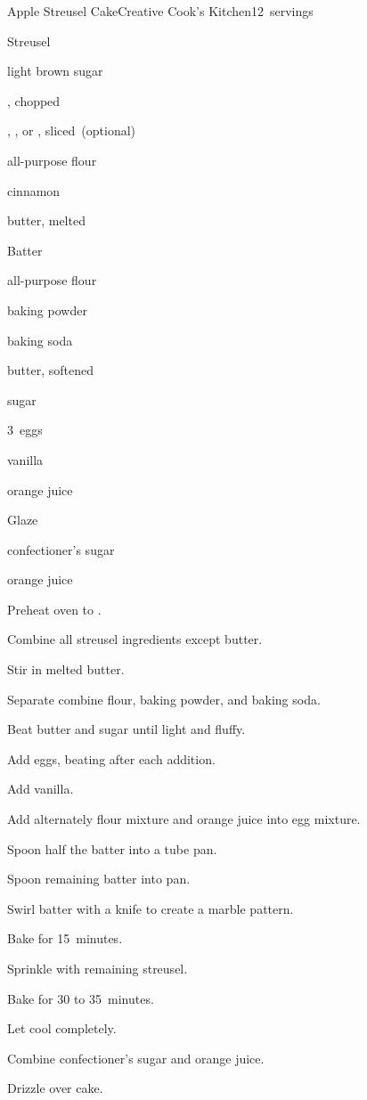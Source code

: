 \begin{recipe}{Apple Streusel Cake}{Creative Cook's Kitchen}{12~servings}

Streusel
\begin{ingredients}
\item {} light brown sugar
\item {} , chopped
\item {} , , or , sliced~(optional)
\item \C{\quarter} all-purpose flour
\item {} cinnamon
\item {} butter, melted
\end{ingredients}

Batter
\begin{ingredients}
\item {} all-purpose flour
\item {} baking powder
\item {} baking soda
\item \C{\half} butter, softened
\item \C{\half} sugar
\item 3~eggs
\item \tp{\half} vanilla
\item \C{\third} orange juice
\end{ingredients}

Glaze
\begin{ingredients}
\item \C{\half} confectioner's sugar
\item \tp{2\half} orange juice
\end{ingredients}

\begin{directions}
\item Preheat oven to .
\item Combine all streusel ingredients except butter.
\item Stir in melted butter.
\item Separate combine flour, baking powder, and baking soda.
\item Beat butter and sugar until light and fluffy.
\item Add eggs, beating after each addition.
\item Add vanilla.
\item Add alternately flour mixture and orange juice into egg mixture.
\item Spoon half the batter into a tube pan.
\item Spoon remaining batter into pan.
\item Swirl batter with a knife to create a marble pattern.
\item Bake for 15~minutes.
\item Sprinkle with remaining streusel.
\item Bake for 30 to 35~minutes.
\item Let cool completely.
\item Combine confectioner's sugar and orange juice.
\item Drizzle over cake.
\end{directions}

\end{recipe}
